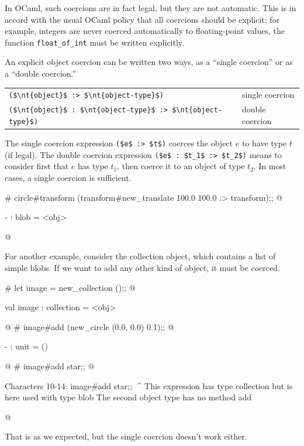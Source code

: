 \label{keyword::>}
In OCaml, such coercions are in fact legal, but they are not automatic.  This is in accord with the usual
OCaml policy that all coercions should be explicit; for example, integers are never coerced automatically
to floating-point values, the function \hbox{\lstinline/float_of_int/} must be written explicitly.

An explicit object coercion can be written two ways, as a ``single coercion'' or as a ``double coercion.''

\begin{center}
\begin{tabular}{ll}
    \lstinline/($\nt{object}$ :> $\nt{object-type}$)/ & single coercion\\
    \lstinline/($\nt{object}$ : $\nt{object-type}$ :> $\nt{object-type}$)/ & double coercion
\end{tabular}
\end{center}
%
The single coercion expression \hbox{\lstinline/($e$ :> $t$)/} coerces the object $e$ to have type $t$ (if
legal).  The double coercion expression \hbox{\lstinline/($e$ : $t_1$ :> $t_2$)/} means to consider first
that $e$ has type $t_1$, then coerce it to an object of type $t_2$.  In most cases, a single
coercion is sufficient.

\begin{ocaml}
# circle#transform (transform#new_translate 100.0 100.0 :> transform);;
@
\begin{topoutput}
- : blob = <obj>
\end{topoutput}
@
\end{ocaml}
%
For another example, consider the collection object, which contains a list of simple blobs.
If we want to add any other kind of object, it must be coerced.

\begin{ocaml}
# let image = new_collection ();;
@
\begin{topoutput}
val image : collection = <obj>
\end{topoutput}
@
# image#add (new_circle (0.0, 0.0) 0.1);;
@
\begin{topoutput}
- : unit = ()
\end{topoutput}
@
# image#add star;;
@
\begin{toperror}
Characters 10-14:
  image#add star;;
            ^^^^
This expression has type collection but is here used with type blob
The second object type has no method add
\end{toperror}
@
\end{ocaml}
%
That is as we expected, but the single coercion doesn't work either.


